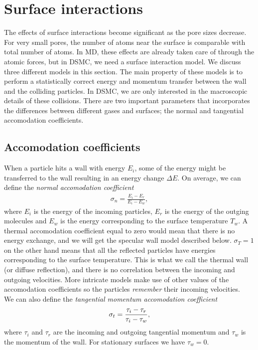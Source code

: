 \section{Surface interactions}
\label{sec:surface_interactions}
The effects of surface interactions become significant as the pore sizes decrease. For very small pores, the number of atoms near the surface is comparable with total number of atoms. In MD, these effects are already taken care of through the atomic forces, but in DSMC, we need a surface interaction model. We discuss three different models in this section. The main property of these models is to perform a statistically correct energy and momentum transfer between the wall and the colliding particles. In DSMC, we are only interested in the macroscopic details of these collisions. There are two important parameters that incorporates the differences between different gases and surfaces; the normal and tangential accomodation coefficients.
\subsection{Accomodation coefficients}
When a particle hits a wall with energy $E_i$, some of the energy might be transferred to the wall resulting in an energy change $\Delta E$. On average, we can define the \textit{normal accomodation coefficient} 
\begin{align}
	\sigma_n = \frac{E_i - E_r}{E_i - E_w},
\end{align}
where $E_i$ is the energy of the incoming particles, $E_r$ is the energy of the outging molecules and $E_w$ is the energy corresponding to the surface temperature $T_w$. A thermal accomodation coefficient equal to zero would mean that there is no energy exchange, and we will get the specular wall model described below. $\sigma_T=1$ on the other hand means that all the reflected particles have energies corresponding to the surface temperature. This is what we call the thermal wall (or diffuse reflection\cite{karniadakis2005microflows}), and there is no correlation between the incoming and outgoing velocities. More intricate models make use of other values of the accomodation coefficients so the particles \textit{remember} their incoming velocities.\\
We can also define the \textit{tangential momentum accomodation coefficient}
\begin{align}
	\sigma_t = {\tau_i - \tau_r\over \tau_i - \tau_w},
\end{align}
where $\tau_i$ and $\tau_r$ are the incoming and outgoing tangential momentum and $\tau_w$ is the momentum of the wall. For stationary surfaces we have $\tau_w=0$.

